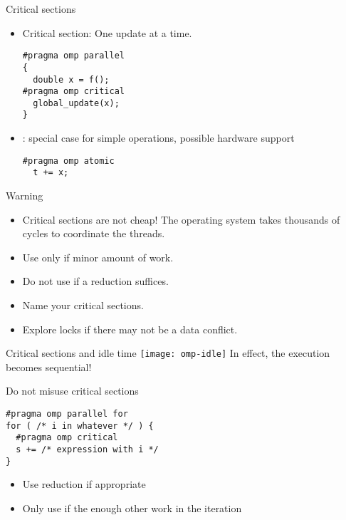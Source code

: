 \begin{numberedframe}{Critical sections}
\begin{itemize}
  \item Critical section: One update at a time.
\begin{verbatim}
#pragma omp parallel
{
  double x = f();
#pragma omp critical
  global_update(x);
}
\end{verbatim}
\item {} : special case for simple operations, possible
  hardware support
\begin{verbatim}
#pragma omp atomic
  t += x;
\end{verbatim}
\end{itemize}
\end{numberedframe}

\begin{numberedframe}{Warning}
  \begin{itemize}
  \item Critical sections are not cheap! The operating system takes
    thousands of cycles to coordinate the threads.
  \item Use only if minor amount of work.
  \item Do not use if a reduction suffices.
  \item Name your critical sections.
  \item Explore locks if there may not be a data conflict.
  \end{itemize}
\end{numberedframe}

\begin{numberedframe}{Critical sections and idle time}
    \texttt{[image: omp-idle]}
    In effect, the execution becomes sequential!
\end{numberedframe}

\begin{numberedframe}{Do not misuse critical sections}
\begin{lstlisting}
#pragma omp parallel for
for ( /* i in whatever */ ) {
  #pragma omp critical
  s += /* expression with i */
}
\end{lstlisting}
  \begin{itemize}
  \item Use reduction if appropriate
  \item Only use if the enough other work in the iteration
  \end{itemize}
\end{numberedframe}

